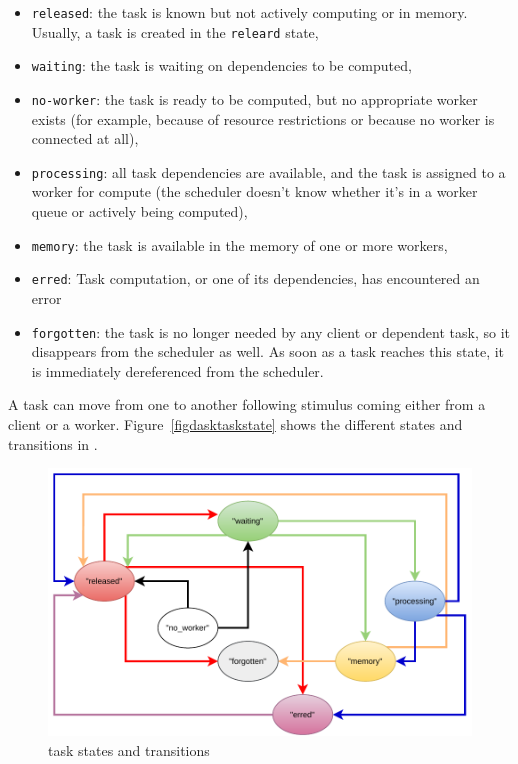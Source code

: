 \begin{itemize}
    \item \texttt{released}: the task is known but not actively computing or in memory. Usually, a task is created in the \texttt{releard} state,

    \item \texttt{waiting}: the task is waiting on dependencies to be computed,

    \item \texttt{no-worker}: the task is ready to be computed, but no appropriate worker exists (for example, because of resource restrictions or because no worker is connected at all),

    \item \texttt{processing}: all task dependencies are available, and the task is assigned to a worker for compute (the scheduler doesn’t know whether it’s in a worker queue or actively being computed),

    \item \texttt{memory}: the task is available in the memory of one or more workers,

    \item \texttt{erred}: Task computation, or one of its dependencies, has encountered an error

    \item \texttt{forgotten}: the task is no longer needed by any client or dependent task, so it disappears from the scheduler as well. As soon as a task reaches this state, it is immediately dereferenced from the scheduler.
\end{itemize}

A task can move from one to another following stimulus coming either from a client or a worker. Figure~\ref{figdasktaskstate} shows the different states and transitions in \dask. 

\begin{figure}[h!]\centering
\includegraphics[scale=0.8]{figures/Dask-TaskStatesSheduler1.pdf}
\caption{\dask task states and transitions}
\label{figdasktaskstate1}
\end{figure}

